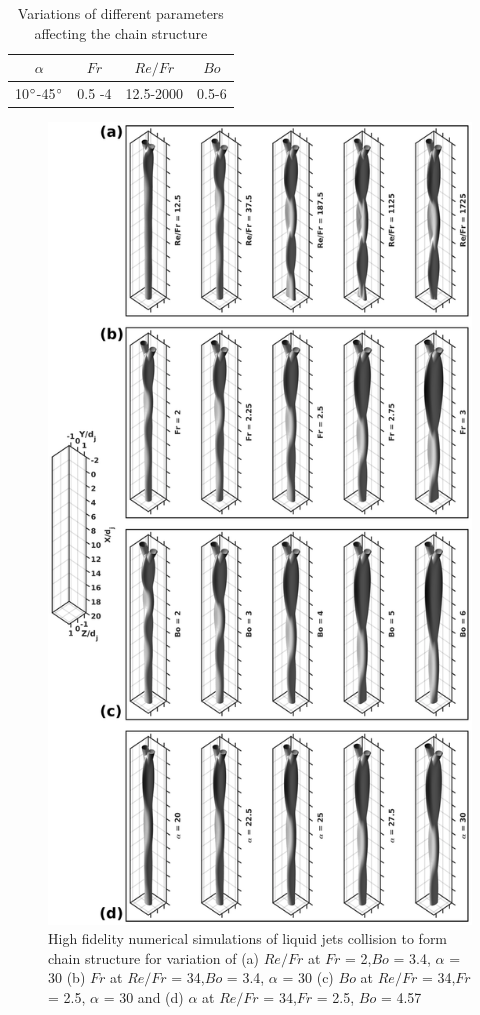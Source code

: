 \documentclass[%
aip,
sd,%
amsmath,amssymb,
preprint,%
author-year,%
]{revtex4-1}
\begin{document}
\begin{table}[]
	\centering
	\caption{Variations of different parameters affecting the chain structure}
	\label{Table::parameters}
	\begin{tabular}{@{}cccc@{}}
		\hline
		$\alpha$ & $Fr$     & $Re/Fr$     & $Bo$    \\ \hline
		10$\degree$-45$\degree$ & 0.5 -4 & 12.5-2000 & 0.5-6 \\ \hline
	\end{tabular}
\end{table}
\begin{figure}
	\centering
	\includegraphics[width=0.68\linewidth]{phaseContours}
	\caption{High fidelity numerical simulations of liquid jets collision to form chain structure for variation of (a) $Re/Fr$ at $Fr$ = 2,$Bo$ = 3.4, $\alpha$ = 30 (b) $Fr$ at $Re/Fr$ = 34,$Bo$ = 3.4, $\alpha$ =  30 (c) $Bo$ at $Re/Fr$ = 34,$Fr$ = 2.5, $\alpha$ = 30 and (d) $\alpha$ at $Re/Fr$ = 34,$Fr$ = 2.5, $Bo$ = 4.57}
	\label{Figure::phaseContours}
\end{figure}
\end{document}
